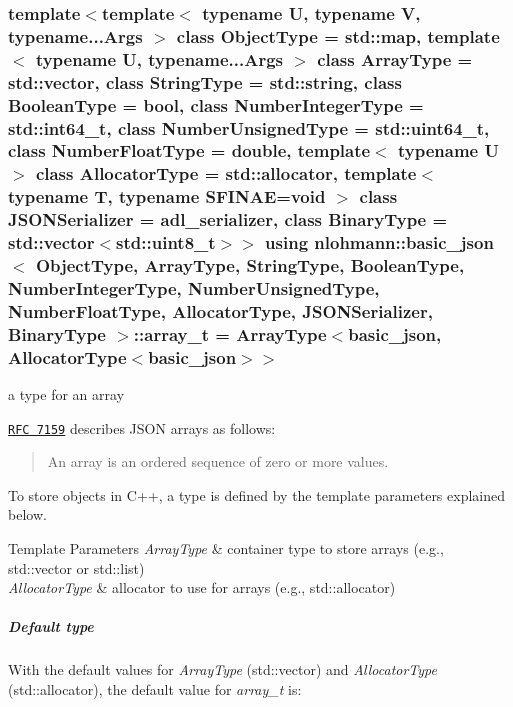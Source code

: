\subsubsection[{\texorpdfstring{array\+\_\+t}{array_t}}]{\setlength{\rightskip}{0pt plus 5cm}template$<$template$<$ typename U, typename V, typename...\+Args $>$ class Object\+Type = std\+::map, template$<$ typename U, typename...\+Args $>$ class Array\+Type = std\+::vector, class String\+Type  = std\+::string, class Boolean\+Type  = bool, class Number\+Integer\+Type  = std\+::int64\+\_\+t, class Number\+Unsigned\+Type  = std\+::uint64\+\_\+t, class Number\+Float\+Type  = double, template$<$ typename U $>$ class Allocator\+Type = std\+::allocator, template$<$ typename T, typename S\+F\+I\+N\+A\+E=void $>$ class J\+S\+O\+N\+Serializer = adl\+\_\+serializer, class Binary\+Type  = std\+::vector$<$std\+::uint8\+\_\+t$>$$>$ using {\bf nlohmann\+::basic\+\_\+json}$<$ Object\+Type, Array\+Type, String\+Type, Boolean\+Type, Number\+Integer\+Type, Number\+Unsigned\+Type, Number\+Float\+Type, Allocator\+Type, J\+S\+O\+N\+Serializer, Binary\+Type $>$\+::{\bf array\+\_\+t} =  Array\+Type$<${\bf basic\+\_\+json}, Allocator\+Type$<${\bf basic\+\_\+json}$>$$>$}\hypertarget{classnlohmann_1_1basic__json_a53700c308d804f84aea5ff05abb2ac4e}{}\label{classnlohmann_1_1basic__json_a53700c308d804f84aea5ff05abb2ac4e}


a type for an array 

\href{http://rfc7159.net/rfc7159}{\tt R\+FC 7159} describes J\+S\+ON arrays as follows\+: \begin{quote}
An array is an ordered sequence of zero or more values. \end{quote}


To store objects in C++, a type is defined by the template parameters explained below.


\begin{DoxyTemplParams}{Template Parameters}
{\em Array\+Type} & container type to store arrays (e.\+g., {\ttfamily std\+::vector} or {\ttfamily std\+::list}) \\
\hline
{\em Allocator\+Type} & allocator to use for arrays (e.\+g., {\ttfamily std\+::allocator})\\
\hline
\end{DoxyTemplParams}
\subparagraph*{Default type}

With the default values for {\itshape Array\+Type} ({\ttfamily std\+::vector}) and {\itshape Allocator\+Type} ({\ttfamily std\+::allocator}), the default value for {\itshape array\+\_\+t} is\+:


